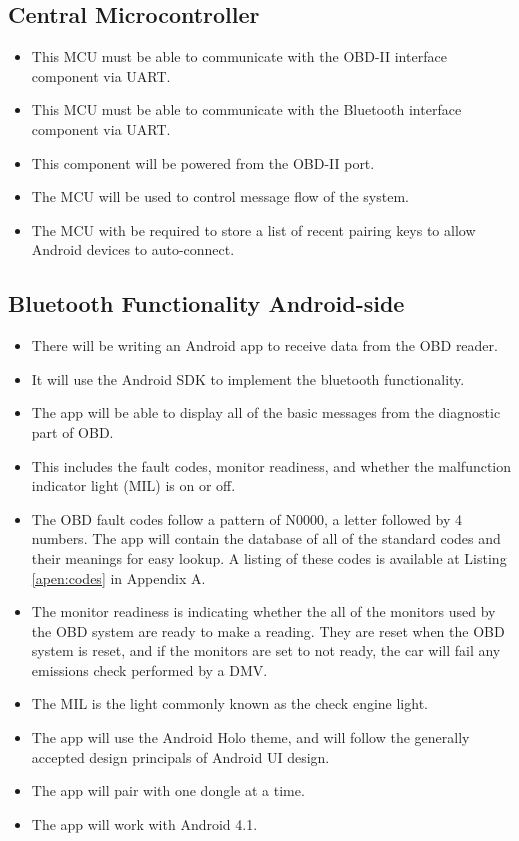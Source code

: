\documentclass[12pt,letterpaper]{article}
\begin{document}
\subsection{Central Microcontroller}
\begin{itemize}
	\item This MCU must be able to communicate with the OBD-II interface component via UART.
	\item This MCU must be able to communicate with the Bluetooth interface component via UART.
	\item This component will be powered from the OBD-II port.
	\item The MCU will be used to control message flow of the system.
	\item The MCU with be required to store a list of recent pairing keys to allow Android devices to auto-connect.
\end{itemize} 

\subsection{Bluetooth Functionality Android-side}
\begin{itemize}
	\item There will be writing an Android app to receive data from the OBD reader.
	\item It will use the Android SDK to implement the bluetooth functionality.
	\item The app will be able to display all of the basic messages from the diagnostic part of OBD.
	\item This includes the fault codes, monitor readiness, and whether the malfunction indicator light (MIL) is on or off.
	\item The OBD fault codes follow a pattern of N0000, a letter followed by 4 numbers. The app will contain the database of all of the standard codes and their meanings for easy lookup. A listing of these codes is available at Listing \ref{apen:codes} in Appendix A.
	\item  The monitor readiness is indicating whether the all of the monitors used by the OBD system are ready to make a reading. They are reset when the OBD system is reset, and if the monitors are set to not ready, the car will fail any emissions check performed by a DMV. 
	\item The MIL is the light commonly known as the check engine light. 
	\item The app will use the Android Holo theme, and will follow the generally accepted design principals of Android UI design.
	\item The app will pair with one dongle at a time.
	\item The app will work with Android 4.1.

\end{itemize}
\end{document}
